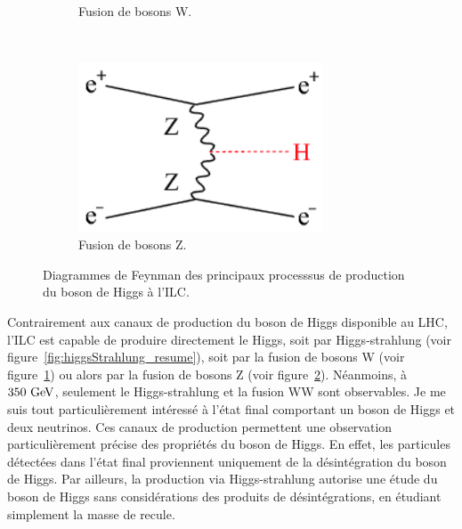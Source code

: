 \begin{figure}
\begin{subfigure}[t]{0.3\textwidth}
            \caption{Fusion de bosons W.}
            \label{fig:WW-fusion_resume}
        \end{subfigure}
        ~%
        \begin{subfigure}[t]{0.3\textwidth}
            \includegraphics[width = 0.8\textwidth]{Pictures/Higgs/HiggsProd_eeH.png}
            \caption{Fusion de bosons Z.}
            \label{fig:ZZ-fusion_resume}
        \end{subfigure}
        \caption{Diagrammes de Feynman des principaux processsus de production du boson de Higgs à l'ILC\cite{Asner2013}\cite{tian}.}
        \label{fig:higgsProduction_resume}
    \end{figure}    

  Contrairement aux canaux de production du boson de Higgs disponible au LHC, l'ILC est capable de produire directement le Higgs, soit par Higgs-strahlung (voir figure~\ref{fig:higgsStrahlung_resume}), soit par la fusion de bosons W (voir figure~\ref{fig:WW-fusion_resume}) ou alors par la fusion de bosons Z (voir figure~\ref{fig:ZZ-fusion_resume}).
  Néanmoins, à $350~\rm{GeV}$, seulement le Higgs-strahlung et la fusion WW sont observables.
  Je me suis tout particulièrement intéressé à l'état final comportant un boson de Higgs et deux neutrinos.
  Ces canaux de production permettent une observation particulièrement précise des propriétés du boson de Higgs. 
  En effet, les particules détectées dans l'état final proviennent uniquement de la désintégration du boson de Higgs. 
  Par ailleurs, la production via Higgs-strahlung autorise une étude du boson de Higgs sans considérations des produits de désintégrations, en étudiant simplement la masse de recule.
  
